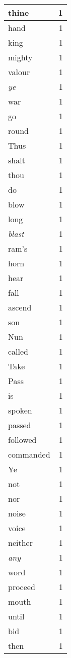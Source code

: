 \begin{center}
\begin{longtable}{l|r}
thine & 1 \\ \hline
hand & 1 \\ \hline
king & 1 \\ \hline
mighty & 1 \\ \hline
valour & 1 \\ \hline
\emph{ye} & 1 \\ \hline
war & 1 \\ \hline
go & 1 \\ \hline
round & 1 \\ \hline
Thus & 1 \\ \hline
shalt & 1 \\ \hline
thou & 1 \\ \hline
do & 1 \\ \hline
blow & 1 \\ \hline
long & 1 \\ \hline
\emph{blast} & 1 \\ \hline
ram's & 1 \\ \hline
horn & 1 \\ \hline
hear & 1 \\ \hline
fall & 1 \\ \hline
ascend & 1 \\ \hline
son & 1 \\ \hline
Nun & 1 \\ \hline
called & 1 \\ \hline
Take & 1 \\ \hline
Pass & 1 \\ \hline
is & 1 \\ \hline
spoken & 1 \\ \hline
passed & 1 \\ \hline
followed & 1 \\ \hline
commanded & 1 \\ \hline
Ye & 1 \\ \hline
not & 1 \\ \hline
nor & 1 \\ \hline
noise & 1 \\ \hline
voice & 1 \\ \hline
neither & 1 \\ \hline
\emph{any} & 1 \\ \hline
word & 1 \\ \hline
proceed & 1 \\ \hline
mouth & 1 \\ \hline
until & 1 \\ \hline
bid & 1 \\ \hline
then & 1 \\ \hline

\end{longtable}
\end{center}
